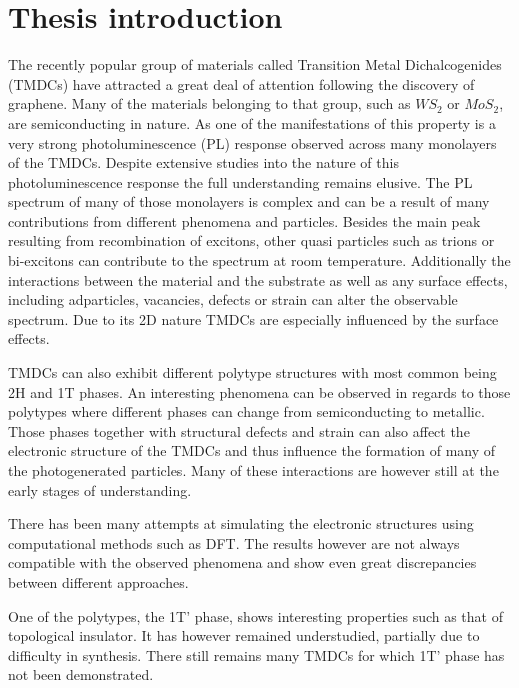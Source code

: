 \chapter{Thesis introduction}

The recently popular group of materials called Transition Metal Dichalcogenides (TMDCs) have attracted a great deal of attention following the discovery of graphene. Many of the materials belonging to that group, such as $WS_2$ or $MoS_2$, are semiconducting in nature. As one of the manifestations of this property is a very strong photoluminescence (PL) response observed across many monolayers of the TMDCs. Despite extensive studies into the nature of this photoluminescence response the full understanding remains elusive. The PL spectrum of many of those monolayers is complex and can be a result of many contributions from different phenomena and particles. Besides the main peak resulting from recombination of excitons, other quasi particles such as trions or bi-excitons can contribute to the spectrum at room temperature. Additionally the interactions between the material and the substrate as well as any surface effects, including adparticles, vacancies, defects or strain can alter the observable spectrum. Due to its 2D nature TMDCs are especially influenced by the surface effects. 

TMDCs can also exhibit different polytype structures with most common being 2H and 1T phases. An interesting phenomena can be observed in regards to those polytypes where different phases can change from semiconducting to metallic. Those phases together with structural defects and strain can also affect the electronic structure of the TMDCs and thus influence the formation of many of the photogenerated particles. Many of these interactions are however still at the early stages of understanding. 

There has been many attempts at simulating the electronic structures using computational methods such as DFT. The results however are not always compatible with the observed phenomena and show even great discrepancies between different approaches.

One of the polytypes, the 1T' phase, shows interesting properties such as that of topological insulator. It has however remained understudied, partially due to difficulty in synthesis. There still remains many TMDCs for which 1T' phase has not been demonstrated.

